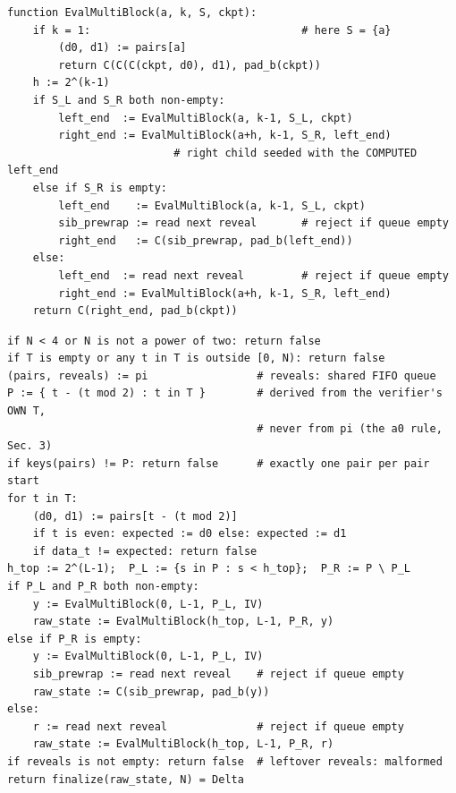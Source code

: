 \begin{algorithm}[H]
\caption{$\textsc{EvalMultiBlock}(a, k, S, \mathit{ckpt})$ -- verifier}
\label{alg:eval-multi}
\begin{lstlisting}[style=pseudo]
function EvalMultiBlock(a, k, S, ckpt):
    if k = 1:                                 # here S = {a}
        (d0, d1) := pairs[a]
        return C(C(C(ckpt, d0), d1), pad_b(ckpt))
    h := 2^(k-1)
    if S_L and S_R both non-empty:
        left_end  := EvalMultiBlock(a, k-1, S_L, ckpt)
        right_end := EvalMultiBlock(a+h, k-1, S_R, left_end)
                          # right child seeded with the COMPUTED left_end
    else if S_R is empty:
        left_end    := EvalMultiBlock(a, k-1, S_L, ckpt)
        sib_prewrap := read next reveal       # reject if queue empty
        right_end   := C(sib_prewrap, pad_b(left_end))
    else:
        left_end  := read next reveal         # reject if queue empty
        right_end := EvalMultiBlock(a+h, k-1, S_R, left_end)
    return C(right_end, pad_b(ckpt))
\end{lstlisting}
\end{algorithm}

\begin{algorithm}[H]
\caption{$\textsc{VerifyMultiProof}(N, \Delta, \{\mathit{data}_t\}_{t \in T}, \pi)$ -- top-level verifier}
\label{alg:verify-multi}
\begin{lstlisting}[style=pseudo]
if N < 4 or N is not a power of two: return false
if T is empty or any t in T is outside [0, N): return false
(pairs, reveals) := pi                 # reveals: shared FIFO queue
P := { t - (t mod 2) : t in T }        # derived from the verifier's OWN T,
                                       # never from pi (the a0 rule, Sec. 3)
if keys(pairs) != P: return false      # exactly one pair per pair start
for t in T:
    (d0, d1) := pairs[t - (t mod 2)]
    if t is even: expected := d0 else: expected := d1
    if data_t != expected: return false
h_top := 2^(L-1);  P_L := {s in P : s < h_top};  P_R := P \ P_L
if P_L and P_R both non-empty:
    y := EvalMultiBlock(0, L-1, P_L, IV)
    raw_state := EvalMultiBlock(h_top, L-1, P_R, y)
else if P_R is empty:
    y := EvalMultiBlock(0, L-1, P_L, IV)
    sib_prewrap := read next reveal    # reject if queue empty
    raw_state := C(sib_prewrap, pad_b(y))
else:
    r := read next reveal              # reject if queue empty
    raw_state := EvalMultiBlock(h_top, L-1, P_R, r)
if reveals is not empty: return false  # leftover reveals: malformed
return finalize(raw_state, N) = Delta
\end{lstlisting}
\end{algorithm}

